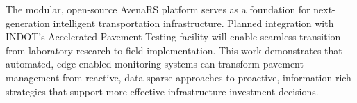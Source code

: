 \documentclass[conference]{IEEEtran}
\begin{document}
The modular, open-source AvenaRS platform serves as a foundation for next-generation intelligent transportation infrastructure.
Planned integration with INDOT's Accelerated Pavement Testing facility will enable seamless transition from laboratory research to field implementation.
This work demonstrates that automated, edge-enabled monitoring systems can transform pavement management from reactive, data-sparse approaches to proactive, information-rich strategies that support more effective infrastructure investment decisions.


\nocite{*}


\end{document}
